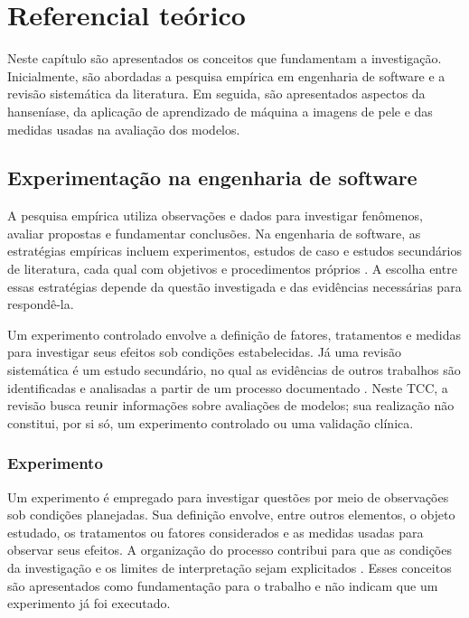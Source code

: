 \chapter{Referencial teórico}
\label{cap:referencial-teorico}

Neste capítulo são apresentados os conceitos que fundamentam a investigação.
Inicialmente, são abordadas a pesquisa empírica em engenharia de software
e a revisão sistemática da literatura. Em seguida, são apresentados aspectos
da hanseníase, da aplicação de aprendizado de máquina a imagens de pele e
das medidas usadas na avaliação dos modelos.

\section{Experimentação na engenharia de software}

A pesquisa empírica utiliza observações e dados para investigar fenômenos,
avaliar propostas e fundamentar conclusões. Na engenharia de software, as
estratégias empíricas incluem experimentos, estudos de caso e estudos
secundários de literatura, cada qual com objetivos e procedimentos próprios
\cite{wohlin2024}. A escolha entre essas estratégias depende da questão
investigada e das evidências necessárias para respondê-la.

Um experimento controlado envolve a definição de fatores, tratamentos e
medidas para investigar seus efeitos sob condições estabelecidas. Já uma
revisão sistemática é um estudo secundário, no qual as evidências de outros
trabalhos são identificadas e analisadas a partir de um processo documentado
\cite[p. 51--56]{wohlin2024}. Neste TCC, a revisão busca reunir informações
sobre avaliações de modelos; sua realização não constitui, por si só, um
experimento controlado ou uma validação clínica.

\subsection{Experimento}

Um experimento é empregado para investigar questões por meio de observações
sob condições planejadas. Sua definição envolve, entre outros elementos, o
objeto estudado, os tratamentos ou fatores considerados e as medidas usadas
para observar seus efeitos. A organização do processo contribui para que
as condições da investigação e os limites de interpretação sejam
explicitados \cite[p. 79--82]{wohlin2024}. Esses conceitos são apresentados
como fundamentação para o trabalho e não indicam que um experimento já
foi executado.

